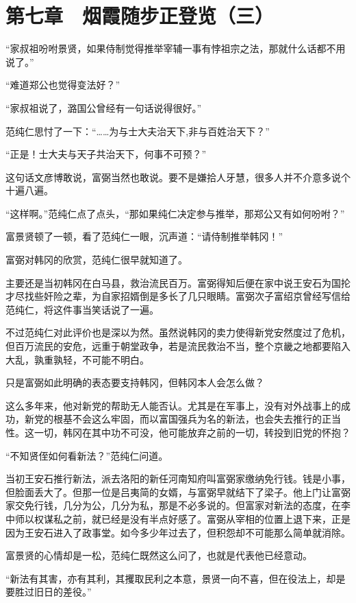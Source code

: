 \section{第七章　烟霞随步正登览（三）}

“家叔祖吩咐景贤，如果侍制觉得推举宰辅一事有悖祖宗之法，那就什么话都不用说了。”

“难道郑公也觉得变法好？”

“家叔祖说了，潞国公曾经有一句话说得很好。”

范纯仁思忖了一下：“……为与士大夫治天下,非与百姓治天下？”

“正是！士大夫与天子共治天下，何事不可预？”

这句话文彦博敢说，富弼当然也敢说。要不是嫌拾人牙慧，很多人并不介意多说个十遍八遍。

“这样啊。”范纯仁点了点头，“那如果纯仁决定参与推举，那郑公又有如何吩咐？”

富景贤顿了一顿，看了范纯仁一眼，沉声道：“请侍制推举韩冈！”

富弼对韩冈的欣赏，范纯仁很早就知道了。

主要还是当初韩冈在白马县，救治流民百万。富弼得知后便在家中说王安石为国抡才尽找些奸险之辈，为自家招婿倒是多长了几只眼睛。富弼次子富绍京曾经写信给范纯仁，将这件事当笑话说了一遍。

不过范纯仁对此评价也是深以为然。虽然说韩冈的卖力使得新党安然度过了危机，但百万流民的安危，远重于朝堂政争，若是流民救治不当，整个京畿之地都要陷入大乱，孰重孰轻，不可能不明白。

只是富弼如此明确的表态要支持韩冈，但韩冈本人会怎么做？

这么多年来，他对新党的帮助无人能否认。尤其是在军事上，没有对外战事上的成功，新党的根基不会这么牢固，而以富国强兵为名的新法，也会失去推行的正当性。这一切，韩冈在其中功不可没，他可能放弃之前的一切，转投到旧党的怀抱？

“不知贤侄如何看新法？”范纯仁问道。

当初王安石推行新法，派去洛阳的新任河南知府叫富弼家缴纳免行钱。钱是小事，但脸面丢大了。但那一位是吕夷简的女婿，与富弼早就结下了梁子。他上门让富弼家交免行钱，几分为公，几分为私，那是不必多说的。但富家对新法的态度，在李中师以权谋私之前，就已经是没有半点好感了。富弼从宰相的位置上退下来，正是因为王安石进入了政事堂。如今多少年过去了，但积怨却不可能那么简单就消除。

富景贤的心情却是一松，范纯仁既然这么问了，也就是代表他已经意动。

“新法有其害，亦有其利，其攫取民利之本意，景贤一向不喜，但在役法上，却是要胜过旧日的差役。”


